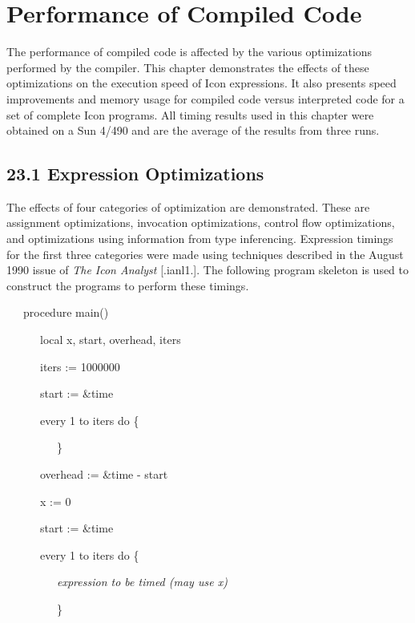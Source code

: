 \chapter{Performance of Compiled Code}

The performance of compiled code is affected by the various
optimizations performed by the compiler. This chapter demonstrates the
effects of these optimizations on the execution speed of Icon
expressions. It also presents speed improvements and memory usage for
compiled code versus interpreted code for a set of complete Icon
programs. All timing results used in this chapter were obtained on a
Sun 4/490 and are the average of the results from three runs.


\section[23.1 Expression Optimizations]{23.1 Expression Optimizations}

The effects of four categories of optimization are demonstrated. These
are assignment optimizations, invocation optimizations, control flow
optimizations, and optimizations using information from type
inferencing. Expression timings for the first three categories were
made using techniques described in the August 1990 issue of
\textit{The Icon Analyst} [.ianl1.]. The following program skeleton is
used to construct the programs to perform these timings.

{\ttfamily\mdseries
\ \ \ procedure main()}

{\ttfamily\mdseries
\ \ \ \ \ \ local x, start, overhead, iters}

{\ttfamily\mdseries
\ \ \ \ \ \ iters := 1000000}

{\ttfamily\mdseries
\ \ \ \ \ \ start := \&time}

{\ttfamily\mdseries
\ \ \ \ \ \ every 1 to iters do \{}

{\ttfamily\mdseries
\ \ \ \ \ \ \ \ \ \}}

{\ttfamily\mdseries
\ \ \ \ \ \ overhead := \&time - start}

{\ttfamily\mdseries
\ \ \ \ \ \ x := 0}

{\ttfamily\mdseries
\ \ \ \ \ \ start := \&time}

{\ttfamily\mdseries
\ \ \ \ \ \ every 1 to iters do \{}

{\ttfamily\mdseries
\ \ \ \ \ \ \ \ \ \textit{expression to be timed (may use x)}}

{\ttfamily\mdseries
\ \ \ \ \ \ \ \ \ \}}

